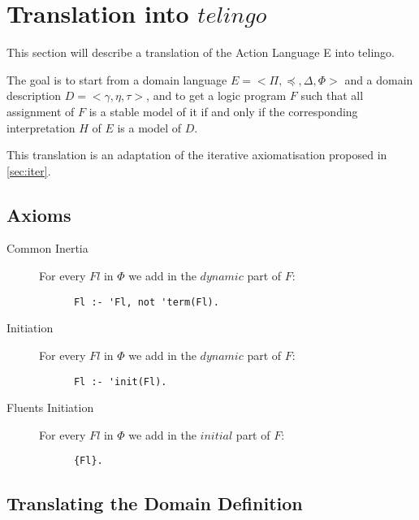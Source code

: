 \section{Translation into $telingo$}\label{sec:translation_telingo}

This section will describe a translation of the Action Language E into telingo.

The goal is to start from a domain language $E=<\Pi,\preceq,\Delta,\Phi>$ and a domain description $D=<\gamma,\eta,\tau>$, and to get a logic program $F$ such that all assignment of $F$ is a stable model of it if and only if the corresponding interpretation $H$ of $E$ is a model of $D$.

This translation is an adaptation of the iterative axiomatisation proposed in \ref{sec:iter}.

\subsection{Axioms}

\begin{description}
  \item[Common Inertia]
    For every $Fl$ in $\Phi$ we add in the $dynamic$ part of $F$:
    \begin{lstlisting}
      Fl :- 'Fl, not 'term(Fl).
    \end{lstlisting}
  \item[Initiation]
    For every $Fl$ in $\Phi$ we add in the $dynamic$ part of $F$:
    \begin{lstlisting}
      Fl :- 'init(Fl).
    \end{lstlisting}
  \item[Fluents Initiation]
    For every $Fl$ in $\Phi$ we add in the $initial$ part of $F$:
    \begin{lstlisting}
      {Fl}.
    \end{lstlisting}
\end{description}

\subsection{Translating the Domain Definition}

